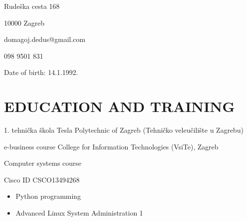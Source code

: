 \documentclass{cv}
\begin{document}

Rudeška cesta 168

10000 Zagreb

domagoj.dedus@gmail.com

098 9501 831

Date of birth: 14.1.1992.
\section{EDUCATION AND TRAINING}
1. tehnička škola Tesla
Polytechnic of Zagreb (Tehničko veleučilište u Zagrebu)

e-business course
College for Information Technologies (VsiTe), Zagreb

Computer systems course

Cisco ID CSCO13494268
\begin{itemize}
    \setlength\itemsep{0.1cm}
    \item Python programming
    \item Advanced Linux System Administration 1
\end{itemize}
\end{document}
